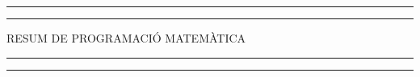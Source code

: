 \newcommand{\plogo}{\fbox{$\mathcal{PL}$}} %

\begin{titlepage} %
	
	\centering %
	
	\scshape %
	
	\vspace*{5\baselineskip} %
	
	
	\rule{\textwidth}{1.6pt}\vspace*{-\baselineskip}\vspace*{2pt} %
	\rule{\textwidth}{0.4pt} %
	
	\vspace{0.75\baselineskip} %
	
	{\LARGE RESUM DE PROGRAMACIÓ MATEMÀTICA\\} %
	
	\vspace{0.75\baselineskip} %
	
	\rule{\textwidth}{0.4pt}\vspace*{-\baselineskip}\vspace{3.2pt} %
	\rule{\textwidth}{1.6pt} %
	
	\vspace{1.5\baselineskip} %
	
	
	
	\vspace*{1\baselineskip} %
	
	
	
	
	\vspace{1\baselineskip} %
	

\end{titlepage}
